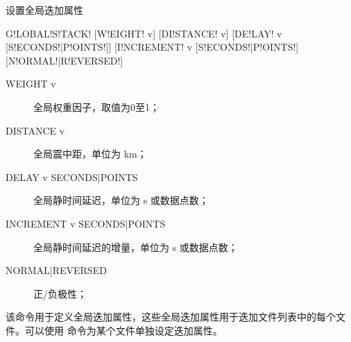 \label{sss:globalstack}

设置全局迭加属性

\begin{SACSTX}
G!LOBAL!S!TACK! [W!EIGHT! v] [DI!STANCE! v] [DE!LAY! v [S!ECONDS!|P!OINTS!]]
    [I!NCREMENT! v [S!ECONDS!|P!OINTS!] [N!ORMAL!|R!EVERSED!]
\end{SACSTX}

\begin{description}
\item [WEIGHT v] 全局权重因子，取值为0至1；
\item [DISTANCE v] 全局震中距，单位为 \si{km}；
\item [DELAY v SECONDS|POINTS] 全局静时间延迟，单位为 \si{\s} 或数据点数；
\item [INCREMENT v SECONDS|POINTS] 全局静时间延迟的增量，单位为 \si{\s} 或数据点数；
\item [NORMAL|REVERSED] 正/负极性；
\end{description}

该命令用于定义全局迭加属性，这些全局迭加属性用于迭加文件列表中的每个文件。可以使用
命令为某个文件单独设定迭加属性。

